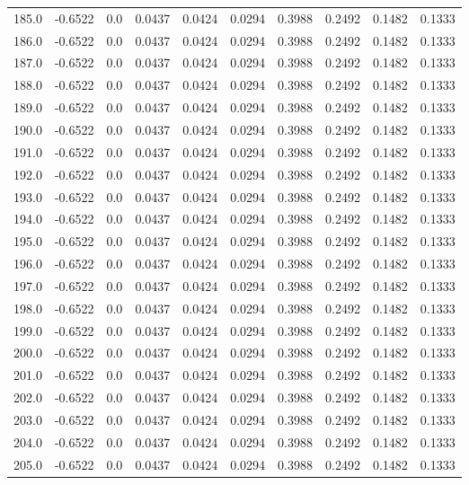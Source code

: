 \begin{longtable}{lrrrrrrrrr}
185.0 & -0.6522 & 0.0 & 0.0437 & 0.0424 & 0.0294 & 0.3988 & 0.2492 & 0.1482 & 0.1333 \\
186.0 & -0.6522 & 0.0 & 0.0437 & 0.0424 & 0.0294 & 0.3988 & 0.2492 & 0.1482 & 0.1333 \\
187.0 & -0.6522 & 0.0 & 0.0437 & 0.0424 & 0.0294 & 0.3988 & 0.2492 & 0.1482 & 0.1333 \\
188.0 & -0.6522 & 0.0 & 0.0437 & 0.0424 & 0.0294 & 0.3988 & 0.2492 & 0.1482 & 0.1333 \\
189.0 & -0.6522 & 0.0 & 0.0437 & 0.0424 & 0.0294 & 0.3988 & 0.2492 & 0.1482 & 0.1333 \\
190.0 & -0.6522 & 0.0 & 0.0437 & 0.0424 & 0.0294 & 0.3988 & 0.2492 & 0.1482 & 0.1333 \\
191.0 & -0.6522 & 0.0 & 0.0437 & 0.0424 & 0.0294 & 0.3988 & 0.2492 & 0.1482 & 0.1333 \\
192.0 & -0.6522 & 0.0 & 0.0437 & 0.0424 & 0.0294 & 0.3988 & 0.2492 & 0.1482 & 0.1333 \\
193.0 & -0.6522 & 0.0 & 0.0437 & 0.0424 & 0.0294 & 0.3988 & 0.2492 & 0.1482 & 0.1333 \\
194.0 & -0.6522 & 0.0 & 0.0437 & 0.0424 & 0.0294 & 0.3988 & 0.2492 & 0.1482 & 0.1333 \\
195.0 & -0.6522 & 0.0 & 0.0437 & 0.0424 & 0.0294 & 0.3988 & 0.2492 & 0.1482 & 0.1333 \\
196.0 & -0.6522 & 0.0 & 0.0437 & 0.0424 & 0.0294 & 0.3988 & 0.2492 & 0.1482 & 0.1333 \\
197.0 & -0.6522 & 0.0 & 0.0437 & 0.0424 & 0.0294 & 0.3988 & 0.2492 & 0.1482 & 0.1333 \\
198.0 & -0.6522 & 0.0 & 0.0437 & 0.0424 & 0.0294 & 0.3988 & 0.2492 & 0.1482 & 0.1333 \\
199.0 & -0.6522 & 0.0 & 0.0437 & 0.0424 & 0.0294 & 0.3988 & 0.2492 & 0.1482 & 0.1333 \\
200.0 & -0.6522 & 0.0 & 0.0437 & 0.0424 & 0.0294 & 0.3988 & 0.2492 & 0.1482 & 0.1333 \\
201.0 & -0.6522 & 0.0 & 0.0437 & 0.0424 & 0.0294 & 0.3988 & 0.2492 & 0.1482 & 0.1333 \\
202.0 & -0.6522 & 0.0 & 0.0437 & 0.0424 & 0.0294 & 0.3988 & 0.2492 & 0.1482 & 0.1333 \\
203.0 & -0.6522 & 0.0 & 0.0437 & 0.0424 & 0.0294 & 0.3988 & 0.2492 & 0.1482 & 0.1333 \\
204.0 & -0.6522 & 0.0 & 0.0437 & 0.0424 & 0.0294 & 0.3988 & 0.2492 & 0.1482 & 0.1333 \\
205.0 & -0.6522 & 0.0 & 0.0437 & 0.0424 & 0.0294 & 0.3988 & 0.2492 & 0.1482 & 0.1333 \\

\end{longtable}
